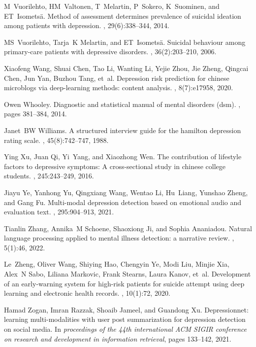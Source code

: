 \begin{thebibliography}{10}
M~Vuorilehto, HM~Valtonen, T~Melartin, P~Sokero, K~Suominen, and
  ET~Isomets{\"a}.
\newblock Method of assessment determines prevalence of suicidal ideation among
  patients with depression.
, 29(6):338--344, 2014.

MS~Vuorilehto, Tarja~K Melartin, and ET~Isomets{\"a}.
\newblock Suicidal behaviour among primary-care patients with depressive
  disorders.
, 36(2):203--210, 2006.

Xiaofeng Wang, Shuai Chen, Tao Li, Wanting Li, Yejie Zhou, Jie Zheng, Qingcai
  Chen, Jun Yan, Buzhou Tang, et~al.
\newblock Depression risk prediction for chinese microblogs via deep-learning
  methods: content analysis.
, 8(7):e17958, 2020.

Owen Whooley.
\newblock Diagnostic and statistical manual of mental disorders (dsm).
, pages 381--384, 2014.

Janet~BW Williams.
\newblock A structured interview guide for the hamilton depression rating
  scale.
, 45(8):742--747, 1988.

Ying Xu, Juan Qi, Yi~Yang, and Xiaozhong Wen.
\newblock The contribution of lifestyle factors to depressive symptoms: A
  cross-sectional study in chinese college students.
, 245:243--249, 2016.

Jiayu Ye, Yanhong Yu, Qingxiang Wang, Wentao Li, Hu~Liang, Yunshao Zheng, and
  Gang Fu.
\newblock Multi-modal depression detection based on emotional audio and
  evaluation text.
, 295:904--913, 2021.

Tianlin Zhang, Annika~M Schoene, Shaoxiong Ji, and Sophia Ananiadou.
\newblock Natural language processing applied to mental illness detection: a
  narrative review.
, 5(1):46, 2022.

Le~Zheng, Oliver Wang, Shiying Hao, Chengyin Ye, Modi Liu, Minjie Xia, Alex~N
  Sabo, Liliana Markovic, Frank Stearns, Laura Kanov, et~al.
\newblock Development of an early-warning system for high-risk patients for
  suicide attempt using deep learning and electronic health records.
, 10(1):72, 2020.

Hamad Zogan, Imran Razzak, Shoaib Jameel, and Guandong Xu.
\newblock Depressionnet: learning multi-modalities with user post summarization
  for depression detection on social media.
\newblock In {\em proceedings of the 44th international ACM SIGIR conference on
  research and development in information retrieval}, pages 133--142, 2021.

\end{thebibliography}
